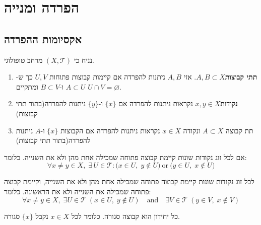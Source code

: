 \documentclass{tstextbook}
\begin{document}
  \chapter{הפרדה ומנייה}

\section{אקסיומות ההפרדה}

נניח כי \((X,\mathcal{T})\) מרחב טופולוגי.

\begin{definition}
  \begin{enumerate}
    \item \textbf{תתי קבוצות}\(A,B \subset X\). אזי \(A,B\) ניתנות להפרדה אם קיימות קבוצות פתוחות \(U,V\) כך ש-\(A\subset U\) ו-\(B \subset V\) ומתקיים \(U \cap V = \varnothing\). 


    \item \textbf{נקודות}\(x,y \in X\) נקראות ניתנות להפרדה אם \(\{ x \}\) ו-\(\{ y \}\) ניתנות להפרדה(בתור תתי קבוצות) 


    \item תת קבוצה \(A \subset X\) ונקודה \(x \in X\) נקראות ניתנות להפרדה אם הקבוצות \(\{ x \}\) ו-\(A\) ניתנות להפרדה(בתור תתי קבוצות) 


  \end{enumerate}
\end{definition}
\begin{definition}
אם לכל זוג נקודות שונות קיימת קבוצה פתוחה שמכילה אחת מהן ולא את השנייה. כלומר:
$$\forall x\neq y\in X,\;\exists\,U\in{\mathcal{T}}:{\big(}x\in U,\;y\notin U{\big)}{\mathrm{~or~}}{\big(}y\in U,\;x\notin U{\big)}$$

\end{definition}
\begin{definition}
לכל זוג נקודות שונות קיימת קבוצה פתוחה שמכילה אחת מהן ולא את השנייה, וקיימת קבוצה פתוחה שמכילה את השנייה ולא את הראשונה. כלומר:
$$\forall x\neq y\in X,\;\exists U\in{\mathcal{T}}\;(x\in U,\;y\notin U)\quad{\mathrm{and}}\quad\exists V\in{\mathcal{T}}\;(y\in V,\;x\notin V)$$

\end{definition}
\begin{proposition}
כל יחידון הוא קבוצה סגורה. כלומר לכל \(x \in X\) נקבל \(\{ x \}\) סגורה.

\end{proposition}
\end{document}
